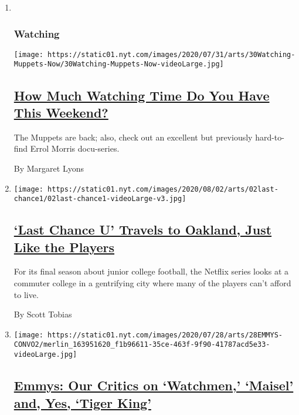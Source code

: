 \begin{enumerate}
\def\labelenumi{\arabic{enumi}.}
\item ~
  \hypertarget{watching}{%
  \subsubsection{Watching}\label{watching}}

  \texttt{[image: https://static01.nyt.com/images/2020/07/31/arts/30Watching-Muppets-Now/30Watching-Muppets-Now-videoLarge.jpg]}

  \hypertarget{how-much-watching-time-do-you-have-this-weekend}{%
  \subsection{\texorpdfstring{\href{/2020/07/30/arts/television/muppets-disney-errol-morris-first-person.html}{How
  Much Watching Time Do You Have This
  Weekend?}}{How Much Watching Time Do You Have This Weekend?}}\label{how-much-watching-time-do-you-have-this-weekend}}

  The Muppets are back; also, check out an excellent but previously
  hard-to-find Errol Morris docu-series.

  By Margaret Lyons
\item
  \texttt{[image: https://static01.nyt.com/images/2020/08/02/arts/02last-chance1/02last-chance1-videoLarge-v3.jpg]}

  \hypertarget{last-chance-u-travels-to-oakland-just-like-the-players}{%
  \subsection{\texorpdfstring{\href{/2020/07/28/arts/television/last-chance-u-season-5.html}{`Last
  Chance U' Travels to Oakland, Just Like the
  Players}}{`Last Chance U' Travels to Oakland, Just Like the Players}}\label{last-chance-u-travels-to-oakland-just-like-the-players}}

  For its final season about junior college football, the Netflix series
  looks at a commuter college in a gentrifying city where many of the
  players can't afford to live.

  By Scott Tobias
\item
  \texttt{[image: https://static01.nyt.com/images/2020/07/28/arts/28EMMYS-CONVO2/merlin\_163951620\_f1b96611-35ce-463f-9f90-41787acd5e33-videoLarge.jpg]}

  \hypertarget{emmys-our-critics-on-watchmen-maisel-and-yes-tiger-king}{%
  \subsection{\texorpdfstring{\href{/2020/07/28/arts/television/emmys-watchmen-handmaids-tale-tiger-king.html}{Emmys:
  Our Critics on `Watchmen,' `Maisel' and, Yes, `Tiger
  King'}}{Emmys: Our Critics on `Watchmen,' `Maisel' and, Yes, `Tiger King'}}\label{emmys-our-critics-on-watchmen-maisel-and-yes-tiger-king}}


\end{enumerate}

